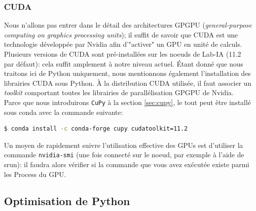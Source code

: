 \documentclass[13pt, a4paper]{extarticle}
\begin{document}
\subsubsection{CUDA}
\noindent Nous n'allons pas entrer dans le détail des architectures GPGPU 
(\emph{general-purpose computing on graphics processing units}); il suffit de savoir que CUDA
est une technologie développée par Nvidia afin d'"activer" un GPU en unité
de calculs. Plusieurs versions de CUDA sont pré-installées sur les noeuds de Lab-IA (11.2 par défaut):
cela suffit amplement à notre niveau actuel. Étant donné que nous traitons ici de Python
uniquement, nous mentionnons également l'installation des librairies CUDA
sous Python. À la distribution CUDA utilisée, il faut associer un \emph{toolkit}
comportant toutes les librairies de parallélisation GPGPU de Nvidia. Parce que nous
introduirons \texttt{CuPy} à la section \ref{sec:cupy}, le tout peut être installé sous conda avec 
la commande suivante:
\begin{tcolorbox}[colback=Goldenrod]
\begin{lstlisting}[language=bash]
  $ conda install -c conda-forge cupy cudatoolkit=11.2
\end{lstlisting}
\end{tcolorbox}
\noindent Un moyen de rapidement suivre l'utilisation effective des GPUs est d'utiliser 
la commande \texttt{nvidia-smi} (une fois connecté sur le noeud, par exemple à l'aide de srun):
il faudra alors vérifier si la commande que vous avez exécutée existe parmi
les Process du GPU. 

\subsection{Optimisation de Python}
\end{document}
